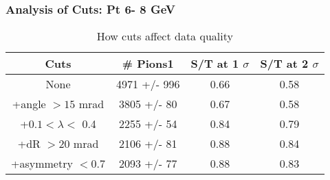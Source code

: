 \frame
{
\frametitle{Analysis of Cuts: Pt  6- 8 GeV}
\begin{table}
\caption{How cuts affect data quality}
\centering
\begin{tabular}{c c c c}
\hline\hline
Cuts & \# Pions1 & S/T at 1 $\sigma$ & S/T at 2 $\sigma$ \\ [0.5ex]
\hline
None & 4971 +/-  996 & 0.66 & 0.58 \\ %
+angle $> 15$ mrad & 3805 +/-   80 & 0.67 & 0.58 \\ %
+$0.1 < \lambda <$ 0.4 & 2255 +/-   54 & 0.84 & 0.79 \\ %
+dR $> 20$ mrad & 2106 +/-   81 & 0.88 & 0.84 \\ %
+asymmetry $< 0.7$ & 2093 +/-   77 & 0.88 & 0.83 \\ %
[1ex]
\hline
\end{tabular}
\label{table:nonlin}
\end{table}
}
